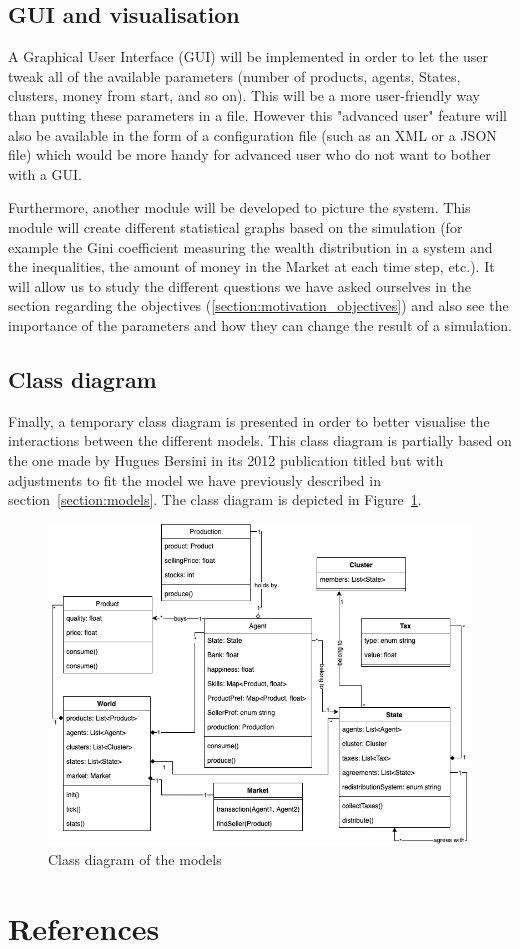 \documentclass[20pt]{article}
\begin{document}
\subsection{GUI and visualisation}
A Graphical User Interface (GUI) will be implemented in order to let the user tweak all of the available parameters (number of products, agents, States, clusters, money from start, and so on). This will be a more user-friendly way than putting these parameters in a file. However this "advanced user" feature will also be available in the form of a configuration file (such as an XML or a JSON file) which would be more handy for advanced user who do not want to bother with a GUI.

Furthermore, another module will be developed to picture the system. This module will create different statistical graphs based on the simulation (for example the Gini coefficient measuring the wealth distribution in a system and the inequalities, the amount of money in the Market at each time step, etc.). It will allow us to study the different questions we have asked ourselves in the section regarding the objectives (\ref{section:motivation_objectives}) and also see the importance of the parameters and how they can change the result of a simulation.

\subsection{Class diagram}

Finally, a temporary class diagram is presented in order to better visualise the interactions between the different models. This class diagram is partially based on the one made by Hugues Bersini in its 2012 publication titled  \cite{umbforabm} but with adjustments to fit the model we have previously described in section~\ref{section:models}. The class diagram is depicted in Figure~\ref{fig:class_diagram}.


    \begin{figure}[H]
        \centering
        \includegraphics[width=1\textwidth]{img/class_diagram.png}
        \caption{Class diagram of the models}
        \label{fig:class_diagram}
    \end{figure}


\newpage

\section{References}
\printbibliography[heading=none]
\end{document}
